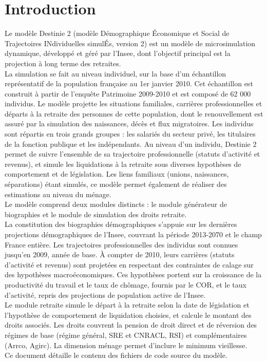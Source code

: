 \section{Introduction}
Le modèle Destinie 2 (modèle Démographique Économique et Social de Trajectoires INdividuelles simulÉs, version 2) est un modèle de microsimulation dynamique, développé et géré par l'Insee, dont l'objectif principal est la projection à long terme des retraites.\\

La simulation se fait au niveau individuel, sur la base d'un échantillon représentatif de la population française au 1er janvier 2010. Cet échantillon est construit à partir de l'enquête Patrimoine 2009-2010 et est composé de 62 000 individus. Le modèle projette les situations familiales, carrières professionnelles et départs à la retraite des personnes de cette population, dont le renouvellement est assuré par la simulation des naissances, décès et flux migratoires. Les individus sont répartis en trois grands groupes : les salariés du secteur privé, les titulaires de la fonction publique et les indépendants. Au niveau d’un individu, Destinie 2 permet de suivre l’ensemble de sa trajectoire professionnelle (statuts d’activité et revenus), et simule les liquidations à la retraite sous diverses hypothèses de comportement et de législation. Les liens familiaux (unions, naissances, séparations) étant simulés, ce modèle permet également de réaliser des estimations au niveau du ménage.\\

Le modèle comprend deux modules distincts : le module générateur de biographies et le module de simulation des droits retraite.\\
La constitution des biographies démographiques s'appuie sur les dernières projections démographiques de l'Insee, couvrant la période 2013-2070 et le champ France entière. Les trajectoires professionnelles des individus sont connues jusqu’en 2009, année de base. \`A compter de 2010, leurs carrières (statuts d’activité et revenus) sont projetées en respectant des contraintes de calage sur des hypothèses macroéconomiques. Ces hypothèses portent sur la croissance de la productivité du travail et le taux de chômage, fournis par le COR, et le taux d'activité, repris des projections de population active de l'Insee.\\
Le module retraite simule le départ à la retraite selon la date de législation et l'hypothèse de comportement de liquidation choisies, et calcule le montant des droits associés. Les droits couvrent la pension de droit direct et de réversion des régimes de base (régime général, SRE et CNRACL, RSI) et complémentaires (Arrco, Agirc). La dimension ménage permet d'inclure le minimum vieillesse.\\
Ce document détaille le contenu des fichiers de code source du modèle. 



